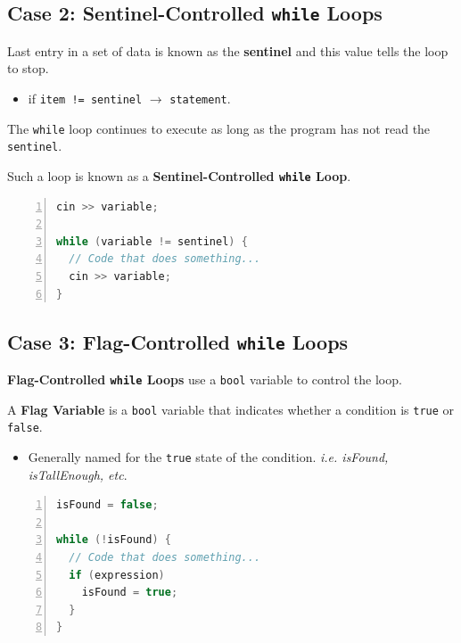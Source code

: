 \documentclass{article}
\begin{document}
\subsection{Case 2: Sentinel-Controlled \texttt{while} Loops}

Last entry in a set of data is known as the \textbf{sentinel} and this value
tells the loop to stop.

\begin{itemize}
  \item if \texttt{item != sentinel} $\rightarrow$ \texttt{statement}.
\end{itemize}

The \texttt{while} loop continues to execute as long as the program has not read
the \texttt{sentinel}.

\vspace{8pt}
Such a loop is known as a \textbf{Sentinel-Controlled \texttt{while} Loop}.

\begin{lstlisting}[language=C++, caption={Sentinel-Controlled \texttt{while} Loop
  Syntax}, numbers=left]
cin >> variable;

while (variable != sentinel) {
  // Code that does something...
  cin >> variable;
}
\end{lstlisting}

\subsection{Case 3: Flag-Controlled \texttt{while} Loops}

\textbf{Flag-Controlled \texttt{while} Loops} use a \texttt{bool} variable to
control the loop.

\vspace{8pt}
A \textbf{Flag Variable} is a \texttt{bool} variable that indicates whether a
condition is \texttt{true} or \texttt{false}.
\begin{itemize}
  \item Generally named for the \texttt{true} state of the condition. \textit{i.e. isFound, isTallEnough, etc}.
\end{itemize}

\begin{lstlisting}[language=C++, caption={Flag-Controlled \texttt{while} Loop
  Example}, numbers=left]
isFound = false;

while (!isFound) {
  // Code that does something...
  if (expression)
    isFound = true;
  }
}
\end{lstlisting}
\end{document}
